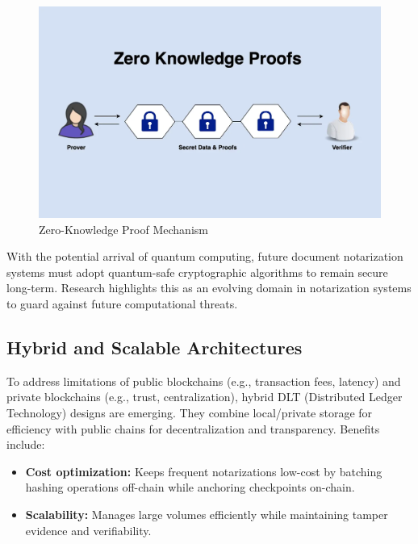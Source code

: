 \begin{figure}[H]
    \centering
    \includegraphics[width=18cm]{"images/zero-knowledge.png"}
    \caption{Zero-Knowledge Proof Mechanism}
    \label{zero-knowledge}
\end{figure}

With the potential arrival of quantum computing, future document notarization systems must adopt quantum-safe cryptographic algorithms to remain secure long-term. Research highlights this as an evolving domain in notarization systems to guard against future computational threats.

\subsection{Hybrid and Scalable Architectures}
To address limitations of public blockchains (e.g., transaction fees, latency) and private blockchains (e.g., trust, centralization), hybrid DLT (Distributed Ledger Technology) designs are emerging. They combine local/private storage for efficiency with public chains for decentralization and transparency. Benefits include:

\begin{itemize}
    \item \textbf{Cost optimization:} Keeps frequent notarizations low-cost by batching hashing operations off-chain while anchoring checkpoints on-chain.
    \item \textbf{Scalability:} Manages large volumes efficiently while maintaining tamper evidence and verifiability.
\end{itemize}


